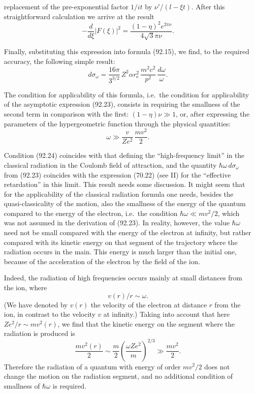 replacement of the pre-exponential factor $1/it$ by $\nu'/(l-\xi t)$. After this straightforward calculation we arrive at the result
\[
-\frac{d}{d\xi}|F(\xi)|^2 = \frac{(1-\eta)^2 e^{2\pi\nu}}{4\sqrt{3}\pi\nu}.
\]

Finally, substituting this expression into formula (92.15), we find, to the required accuracy, the following simple result:
\begin{equation}
d\sigma_\omega = \frac{16\pi}{3^{3/2}}\,Z^2\alpha r_\mathrm{e}^2\,\frac{m^2c^2}{p^2}\,\frac{d\omega}{\omega}.
\label{eq:92.23}
\end{equation}

The condition for applicability of this formula, i.e.\ the condition for applicability of the asymptotic expression (92.23), consists in requiring the smallness of the second term in comparison with the first: $(1-\eta)\nu \gg 1$, or, after expressing the parameters of the hypergeometric function through the physical quantities:
\begin{equation}
\omega \gg \frac{v}{Ze^2}\,\frac{mv^2}{2}.
\label{eq:92.24}
\end{equation}

Condition (92.24) coincides with that defining the ``high-frequency limit'' in the classical radiation in the Coulomb field of attraction, and the quantity $\hbar\omega\,d\sigma_\omega$ from (92.23) coincides with the expression (70.22) (see II) for the ``effective retardation'' in this limit. This result needs some discussion. It might seem that for the applicability of the classical radiation formula one needs, besides the quasi-classicality of the motion, also the smallness of the energy of the quantum compared to the energy of the electron, i.e.\ the condition $\hbar\omega \ll mv^2/2$, which was not assumed in the derivation of (92.23). In reality, however, the value $\hbar\omega$ need not be small compared with the energy of the electron at infinity, but rather compared with its kinetic energy on that segment of the trajectory where the radiation occurs in the main. This energy is much larger than the initial one, because of the acceleration of the electron by the field of the ion.

Indeed, the radiation of high frequencies occurs mainly at small distances from the ion, where
\begin{equation}
v(r)/r \sim \omega.
\label{eq:92.25}
\end{equation}
(We have denoted by $v(r)$ the velocity of the electron at distance $r$ from the ion, in contrast to the velocity $v$ at infinity.) Taking into account that here $Ze^2/r \sim mv^2(r)$, we find that the kinetic energy on the segment where the radiation is produced is
\[
\frac{mv^2(r)}{2} \sim \frac{m}{2}\left(\frac{\omega Ze^2}{m}\right)^{\!2/3} \gg \frac{mv^2}{2}.
\]
Therefore the radiation of a quantum with energy of order $mv^2/2$ does not change the motion on the radiation segment, and no additional condition of smallness of $\hbar\omega$ is required.

